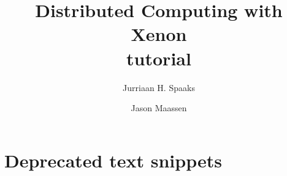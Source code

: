 \documentclass[12pt, a4paper, twoside,openany,titlepage]{article}
\author{Jurriaan H. Spaaks \and Jason Maassen}
\title{\textbf{Distributed Computing with Xenon} \\ tutorial}
\newcommand{\insertemptypage}[0]{
\vfill
\newpage
\thispagestyle{empty}
\mbox{}
\pagebreak
}
\begin{document}
\maketitle

\insertemptypage{}

\pagestyle{plain}
\frontmatter

\tableofcontents
\insertemptypage{}

\mainmatter













\clearpage










\clearpage

\section{Deprecated text snippets}













\backmatter

\printindex
\end{document}
